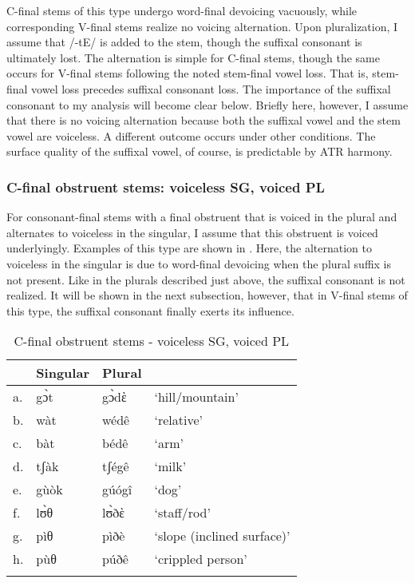 \documentclass[output=paper,colorlinks,citecolor=brown]{langscibook}
\begin{document}
C-final stems of this type undergo word-final devoicing vacuously, while corresponding V-final stems realize no voicing alternation. Upon pluralization, I assume that /-tE/ is added to the stem, though the suffixal consonant  is ultimately lost. The alternation is simple for C-final stems, though the same occurs for V-final stems following the noted stem-final vowel loss. That is, stem-final vowel loss precedes suffixal consonant loss. The importance of the suffixal consonant to my analysis will become clear below. Briefly here, however, I assume that there is no voicing alternation because both the suffixal vowel and the stem vowel are voiceless. A different outcome occurs under other conditions. The surface quality of the suffixal vowel, of course, is predictable by  ATR harmony.

\subsubsection{C-final obstruent stems: voiceless SG, voiced PL}

For consonant-final stems with a final obstruent that is voiced in the plural and alternates to voiceless in the singular, I assume that this obstruent is voiced underlyingly. Examples of this type are shown in . Here, the alternation to voiceless in the singular is due to word-final devoicing when the plural suffix is not present. Like in the plurals described just above, the suffixal consonant is not realized. It will be shown in the next subsection, however, that in V-final stems of this type, the suffixal consonant finally exerts its influence.

\begin{table}[H]
\caption{C-final obstruent stems - voiceless SG, voiced PL}
\label{tab:FinalDeVoicing}
 \begin{tabular}{llll}
  \lsptoprule
& Singular & Plural &  \\
\midrule
a.&	gɔ̀t	&gɔ̀dὲ	&`hill/mountain' \\
b.&	wàt	&wédê	&`relative' \\
c.&	bàt	&bédê&	`arm' \\
d.&	tʃàk&	tʃégê&	`milk' \\
e. & gùòk & gúógî & `dog' \\
f.	&lʊ̀θ&	lʊ̀ðὲ	&`staff/rod' \\
g.&	pìθ	&pìðè&	`slope (inclined surface)' \\
h.&	pùθ	&púðê&	`crippled person' \\
  \lspbottomrule
 \end{tabular}
\end{table}   
\end{document}
